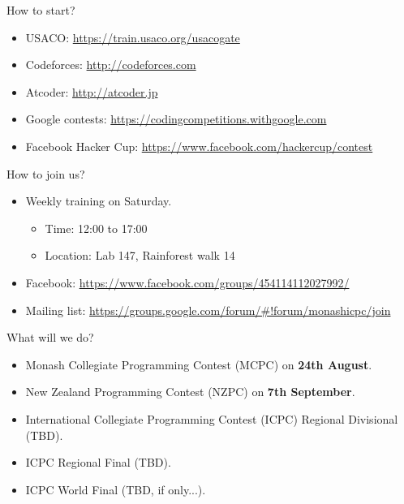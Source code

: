 \begin{frame}{How to start?}
  \begin{itemize}
    \item USACO: \small \url {https://train.usaco.org/usacogate}
    \item Codeforces: \small \url {http://codeforces.com}
    \item Atcoder: \small \url {http://atcoder.jp}
    \item Google contests: \small \url {https://codingcompetitions.withgoogle.com}
    \item Facebook Hacker Cup: \small \url {https://www.facebook.com/hackercup/contest}
  \end{itemize}
\end{frame}

\begin{frame}{How to join us?}
  \begin{itemize}
    \item Weekly training on Saturday.
      \begin{itemize}
        \item \small Time: 12:00 to 17:00
        \item \small Location: Lab 147, Rainforest walk 14
      \end{itemize}
    \item Facebook: \small \url {https://www.facebook.com/groups/454114112027992/}
    \item Mailing list: \small \url {https://groups.google.com/forum/\#!forum/monashicpc/join}
  \end{itemize}
\end{frame}

\begin{frame}{What will we do?}
  \begin{itemize}
    \item Monash Collegiate Programming Contest (MCPC) on \textbf{24th August}.
    \item New Zealand Programming Contest (NZPC) on \textbf{7th September}.
    \item International Collegiate Programming Contest (ICPC) Regional Divisional (TBD).
    \item ICPC Regional Final (TBD).
    \item ICPC World Final (TBD, if only...).
  \end{itemize}
\end{frame}
